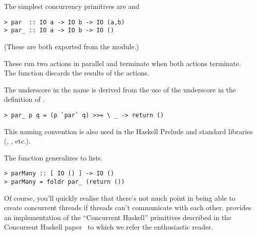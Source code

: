 The simplest concurrency primitives are  and 

\begin{verbatim}
> par  :: IO a -> IO b -> IO (a,b)
> par_ :: IO a -> IO b -> IO ()
\end{verbatim}

(These are both exported from the  module.)

These run two  actions in parallel and terminate when both
actions terminate.  The function  discards the results of
the actions.

\begin{aside}
The underscore in the name  is derived from the use of
the underscore in the definition of .
 
\begin{verbatim}
> par_ p q = (p `par` q) >>= \ _ -> return ()
\end{verbatim}

This naming convention is also used in the Haskell Prelude and
standard libraries (, , etc.).
\end{aside}

The function  generalizes  to lists.

\begin{verbatim}
> parMany :: [ IO () ] -> IO ()
> parMany = foldr par_ (return ())
\end{verbatim}

Of course, you'll quickly realise that there's not much point in being
able to create concurrent threads if threads can't communicate with
each other.  \Hugs{} provides an implementation of the ``Concurrent
Haskell'' primitives described in the Concurrent Haskell
paper~\cite{concurrentHaskell:popl96} to which we refer the enthusiastic reader.

% 
% 
% 
% 
% 
% 
% 
% 

